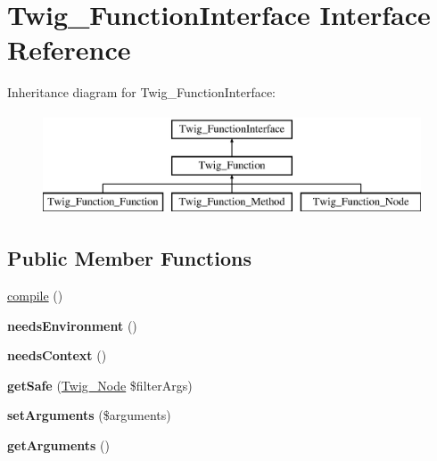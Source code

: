 \hypertarget{interface_twig___function_interface}{}\section{Twig\+\_\+\+Function\+Interface Interface Reference}
\label{interface_twig___function_interface}
Inheritance diagram for Twig\+\_\+\+Function\+Interface\+:\begin{figure}[H]
\begin{center}
\leavevmode
\includegraphics[height=3.000000cm]{interface_twig___function_interface}
\end{center}
\end{figure}
\subsection*{Public Member Functions}
\begin{DoxyCompactItemize}
\item 
\hyperlink{interface_twig___function_interface_a3815e7c2e73f00c2ebffcf5b90eef3b1}{compile} ()
\item 
\hypertarget{interface_twig___function_interface_a711311882c7dd1058f92f7eb0e8edeeb}{}{\bfseries needs\+Environment} ()\label{interface_twig___function_interface_a711311882c7dd1058f92f7eb0e8edeeb}

\item 
\hypertarget{interface_twig___function_interface_a52c35bc6da8861f40aa59f1b99f7ef0f}{}{\bfseries needs\+Context} ()\label{interface_twig___function_interface_a52c35bc6da8861f40aa59f1b99f7ef0f}

\item 
\hypertarget{interface_twig___function_interface_acc5701ec146ba15919020bbc42941632}{}{\bfseries get\+Safe} (\hyperlink{class_twig___node}{Twig\+\_\+\+Node} \$filter\+Args)\label{interface_twig___function_interface_acc5701ec146ba15919020bbc42941632}

\item 
\hypertarget{interface_twig___function_interface_a2b7df0e0f61ee886144db2d59fc0d7da}{}{\bfseries set\+Arguments} (\$arguments)\label{interface_twig___function_interface_a2b7df0e0f61ee886144db2d59fc0d7da}

\item 
\hypertarget{interface_twig___function_interface_a1d4c324c5a088be98d99d3efbf3502e1}{}{\bfseries get\+Arguments} ()\label{interface_twig___function_interface_a1d4c324c5a088be98d99d3efbf3502e1}

\end{DoxyCompactItemize}


